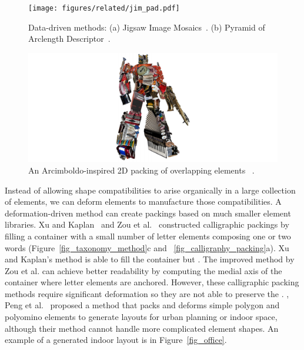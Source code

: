\begin{figure}
\centering
\texttt{[image: figures/related/jim\_pad.pdf]} 
\caption[Packings generated by JIM and PAD]
{\label{fig_related_jim_pad} 
\newtext
{
Data-driven methods:
(a) Jigsaw Image Mosaics~\cite{Kim2002}.
(b) Pyramid of Arclength Descriptor~\cite{Kwan2016}. 
}
}
\end{figure}




\begin{figure}
\centering
\includegraphics[width=1.0\textwidth]{figures/related/optimus.pdf} 
\caption[An Arcimboldo-inspired 2D packing]
{\label{fig_related_optimus} 
\newtext
{
An Arcimboldo-inspired 2D packing of overlapping elements~\cite{Huang2011} .
}
}
\end{figure}

\newtext
{
Instead of allowing shape compatibilities to arise organically in a large collection of elements, 
we can deform elements to manufacture those compatibilities.
A deformation-driven method can create packings based on much smaller element libraries.
Xu and Kaplan~\cite{Xu2007} and Zou et al.~\cite{Zou2016} constructed calligraphic packings by filling a container with a small
number of letter elements composing one or two words (Figure~\ref{fig_taxonomy_method}c and ~\ref{fig_calligraphy_packing}a). 
Xu and Kaplan's method is able to fill the container but 
.
The improved method by Zou et al. can achieve better readability by computing
the medial axis of the container where letter elements are anchored.
However, these calligraphic packing methods require significant deformation 
so they are not able to preserve the .
, 
Peng et al.~\cite{Peng2014} proposed a method that packs and deforms
simple polygon and polyomino elements to generate layouts for urban planning or indoor space, 
although their method cannot handle more complicated element shapes. 
An example of a generated indoor layout is  in Figure~\ref{fig_office}.
}


